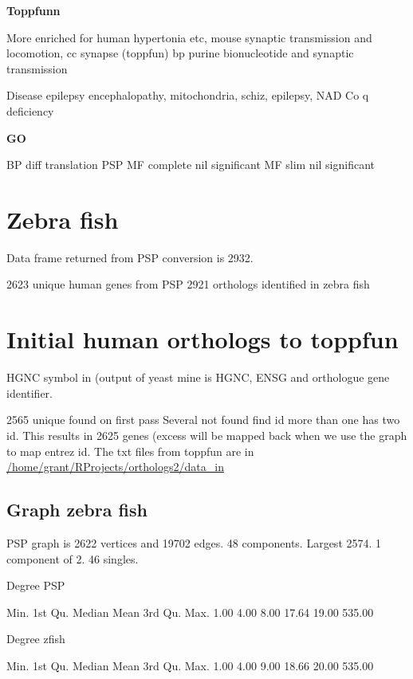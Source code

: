 \textbf{Toppfunn}

More enriched for human hypertonia etc, mouse synaptic transmission and locomotion, cc synapse (toppfun)    bp purine bionucleotide and synaptic transmission

Disease epilepsy encephalopathy, mitochondria, schiz, epilepsy, NAD Co q deficiency

\textbf{GO}

BP diff translation PSP
MF complete nil significant
MF slim nil significant





\section{Zebra fish}

Data frame returned from PSP conversion is 2932.

2623 unique human genes from PSP 
2921 orthologs identified in zebra fish

\section{Initial human orthologs to toppfun}
HGNC symbol in (output of yeast mine is HGNC, ENSG and orthologue gene identifier. 

2565 unique found on first pass Several not found find id more than one has two id.
This results in 2625 genes (excess will be mapped back when we use the graph to map entrez id. The txt files from toppfun are in \url{/home/grant/RProjects/orthologs2/data_in}
    
\subsection{Graph zebra fish}

PSP graph is 2622 vertices and 19702 edges. 48 components. Largest 2574. 1 component of 2. 46 singles. 

Degree PSP

 Min. 1st Qu.  Median    Mean 3rd Qu.    Max. 
   1.00    4.00    8.00   17.64   19.00  535.00 
   
Degree zfish
   
  
  
Min. 1st Qu.  Median    Mean 3rd Qu.    Max. 
1.00    4.00    9.00   18.66   20.00  535.00  
    
